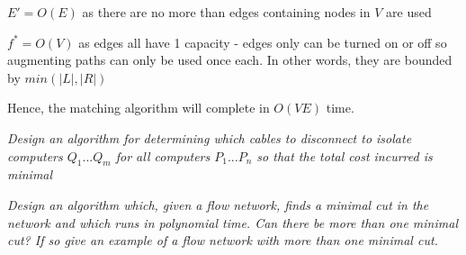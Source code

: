 \documentclass[11pt, a4paper]{article}
\begin{document}
$E' = O(E)$ as there are no more than edges containing nodes in $V$ are used

$f^{*} = O(V)$ as edges all have 1 capacity - edges only can be turned on or off
so augmenting paths can only be used once each. In other words, they are bounded
by $min(|L|, |R|)$

Hence, the matching algorithm will complete in $O(VE)$ time.


\textit{Design an algorithm for determining which cables to disconnect to
  isolate computers $Q_{1} ... Q_{m}$ for all computers $P_{1} ... P_{n}$ so 
that the total cost incurred is minimal}


\vspace{35mm}

\textit{Design an algorithm which, given a flow network, finds a minimal cut in the network and which runs in polynomial time. Can there be more than one minimal cut? If so give an example of a flow network with more than one minimal cut.}
\end{document}
